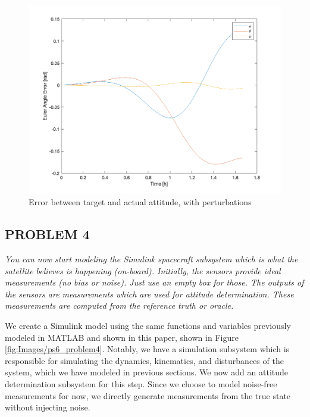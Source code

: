\begin{figure}[H]
\centering
\includegraphics[scale=0.6]{Images/ps6_problem3_error.png}
\caption{Error between target and actual attitude, with perturbations}
\label{fig:Images/ps6_problem3_error}
\end{figure}

\subsection{PROBLEM 4}
\textit{You can now start modeling the Simulink spacecraft subsystem which is what the satellite believes is happening (on-board). Initially, the sensors provide ideal measurements (no bias or noise). Just use an empty box for those. The outputs of the sensors are measurements which are used for attitude determination. These measurements are computed from the reference truth or oracle.}

We create a Simulink model using the same functions and variables previously modeled in MATLAB and shown in this paper, shown in Figure \ref{fig:Images/ps6_problem4}. Notably, we have a simulation subsystem which is responsible for simulating the dynamics, kinematics, and disturbances of the system, which we have modeled in previous sections. We now add an attitude determination subsystem for this step. Since we choose to model noise-free measurements for now, we directly generate measurements from the true state without injecting noise.

